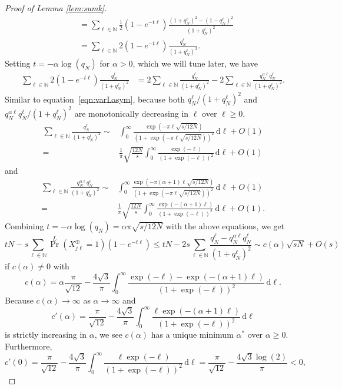 \documentclass[10pt,a4paper]{amsart}
\renewcommand{\geq}{\geqslant}
\renewcommand{\leq}{\leqslant}
\newcommand{\natu}{\mathbb{N}}
\newcommand{\rd}{\,\mathrm{d}}
\begin{document}
\begin{proof}[Proof of Lemma \ref{lem:sumk}]
\begin{align*}
        &=\sum_{\ell\in\natu}\frac{1}{2}(1-e^{-t\ell })\frac{(1+q_N^\ell)^2-(1-q_N^\ell)^2}{(1+q_N^\ell)^2}\\
        &=\sum_{\ell\in\natu}2(1-e^{-t\ell })\frac{q_N^\ell}{(1+q_N^\ell)^2}.
    \end{align*}
    Setting $t=-\alpha\log(q_N)$ for $\alpha> 0$, which we will tune later, we have
    \begin{align*}
    \sum_{\ell\in\natu}2(1-e^{-t\ell })\frac{q_N^\ell}{(1+q_N^\ell)^2}
        &=2\sum_{\ell\in\natu}\frac{q_N^\ell}{(1+q_N^\ell)^2}-2\sum_{\ell\in\natu}\frac{q_N^{\alpha\ell}q_N^\ell}{(1+q_N^\ell)^2}.
    \end{align*}
    Similar to equation~\eqref{eqn:varLasym}, because both $q_N^\ell/(1+q_N^\ell)^2$ and $q_N^{\alpha\ell}q_N^\ell/(1+q_N^\ell)^2$ are monotonically decreasing in $\ell$ over $\ell\geq 0$,
    \begin{align*}
       \sum_{\ell\in\natu}\frac{q_N^\ell}{(1+q_N^\ell)^2}\sim &\int_0^\infty \frac{ \exp(-\pi\ell\sqrt{s/12N})}{(1+\exp(-\pi\ell\sqrt{s/12N}))^2}\rd\ell+O(1)\\
       =&\frac{1}{\pi}\sqrt{\frac{12 N}{s}}\int_0^\infty \frac{ \exp(-\ell)}{(1+\exp(-\ell))^2}\rd\ell+O(1)
    \end{align*}
    and
    \begin{align*}
        \sum_{\ell\in\natu}\frac{q_N^{\alpha\ell}q_N^\ell}{(1+q_N^\ell)^2}\sim &\int_0^\infty \frac{ \exp(-\pi(\alpha+1)\ell\sqrt{s/12N})}{(1+\exp(-\pi\ell\sqrt{s/12N}))^2}\rd\ell+O(1)\\
        =&\frac{1}{\pi}\sqrt{\frac{12 N}{s}}\int_0^\infty \frac{ \exp(-(\alpha+1)\ell)}{(1+\exp(-\ell))^2}\rd\ell+O(1). 
    \end{align*}
    Combining $t=-\alpha\log(q_N)=\alpha \pi\sqrt{s/12N}$ with the above equations, we get
    $$tN-s\sum_{\ell\in\natu}{\textstyle\Pr}^L(X^\oplus_{j\ell}=1)(1-e^{-t\ell })\leq tN-2s\sum_{\ell\in\natu}\frac{q_N^\ell-q_N^{\alpha\ell}q_N^\ell}{(1+q_N^\ell)^2}\sim c(\alpha)\sqrt{sN}+O(s)$$
    if $c(\alpha)\neq 0$ with 
    $$c(\alpha)=\alpha\frac{\pi}{\sqrt{12}}-\frac{4\sqrt{3 }}{\pi}\int_0^\infty \frac{\exp(-\ell)- \exp(-(\alpha+1)\ell)}{(1+\exp(-\ell))^2}\rd\ell.$$
    Because $c(\alpha)\to\infty$ as $\alpha\to \infty$ and
    $$c'(\alpha)=\frac{\pi}{\sqrt{12}}-\frac{4\sqrt{3}}{\pi}\int_0^\infty \frac{ \ell\exp(-(\alpha+1)\ell)}{(1+\exp(-\ell))^2}\rd\ell$$
    is strictly increasing in $\alpha$, we see $c(\alpha)$ has a unique minimum $\alpha^*$ over $\alpha\geq 0$. Furthermore,
     $$c'(0)=\frac{\pi}{\sqrt{12}}-\frac{4\sqrt{3}}{\pi}\int_0^\infty \frac{ \ell\exp(-\ell)}{(1+\exp(-\ell))^2}\rd\ell=\frac{\pi}{\sqrt{12}}-\frac{4\sqrt{3}\log(2)}{\pi}<0,$$

\end{proof}
\end{document}
